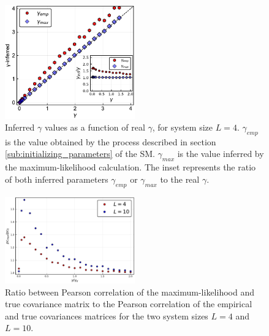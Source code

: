 \documentclass[preprint,amsmath,amssymb,superscriptaddress,showpacs,pre]{revtex4-1}
\providecommand{\DIFaddbeginFL}{} %
\providecommand{\DIFaddendFL}{} %
\providecommand{\DIFdelbeginFL}{} %
\providecommand{\DIFdelendFL}{} %
\newcommand{\DIFscaledelfig}{0.5}
\newlength{\DIFdelgraphicswidth} %
\newlength{\DIFdelgraphicsheight} %
\newcommand{\DIFaddincludegraphics}[2][]{{\color{blue}\fbox{\DIFOincludegraphics[#1]{#2}}}} %
\newcommand{\DIFdelincludegraphics}[2][]{%
\sbox{\DIFdelgraphicsbox}{\DIFOincludegraphics[#1]{#2}}%
\settoboxwidth{\DIFdelgraphicswidth}{\DIFdelgraphicsbox} %
\settoboxtotalheight{\DIFdelgraphicsheight}{\DIFdelgraphicsbox} %
\scalebox{\DIFscaledelfig}{%
\parbox[b]{\DIFdelgraphicswidth}{\usebox{\DIFdelgraphicsbox}\\[-\baselineskip] \rule{\DIFdelgraphicswidth}{0em}}\llap{\resizebox{\DIFdelgraphicswidth}{\DIFdelgraphicsheight}{%
\setlength{\unitlength}{\DIFdelgraphicswidth}%
\begin{picture}(1,1)%
\thicklines\linethickness{2pt} %
{\color[rgb]{1,0,0}\put(0,0){\framebox(1,1){}}}%
{\color[rgb]{1,0,0}\put(0,0){\line( 1,1){1}}}%
{\color[rgb]{1,0,0}\put(0,1){\line(1,-1){1}}}%
\end{picture}%
}\hspace*{3pt}}} %
} %
\DeclareRobustCommand{\DIFaddbeginFL}{\DIFOaddbeginFL \let\includegraphics\DIFaddincludegraphics} %
\DeclareRobustCommand{\DIFaddendFL}{\DIFOaddendFL \let\includegraphics\DIFOincludegraphics} %
\DeclareRobustCommand{\DIFdelbeginFL}{\DIFOdelbeginFL \let\includegraphics\DIFdelincludegraphics} %
\DeclareRobustCommand{\DIFdelendFL}{\DIFOaddendFL \let\includegraphics\DIFOincludegraphics} %
\begin{document}
\begin{figure}[!htb]
	\centering
	\DIFdelbeginFL %
\DIFdelendFL \DIFaddbeginFL \includegraphics[keepaspectratio=true,width=0.5\textwidth]{Figures/scatter_gamma_L4_100.pdf}
	\DIFaddendFL \caption{Inferred $\gamma$ values as a function of real $\gamma$, for system size $L=4$. $\gamma_{emp}$ is the value obtained by the process described in section \ref{sub:initializing_parameters} of the SM. $\gamma_{max}$ is the value inferred by the maximum-likelihood calculation. 
	The inset represents the ratio of both inferred parameters $\gamma_{emp}$ or $\gamma_{max}$ to the real $\gamma$.}
	\label{fig:scatter_gamma_L4}
\end{figure}


\begin{figure}[!htb]
	\centering
	\DIFdelbeginFL %
\DIFdelendFL \DIFaddbeginFL \includegraphics[keepaspectratio=true,width=0.5\textwidth]{Figures/Pearson_correlation_rate_full_range.pdf}
	\DIFaddendFL \caption{  Ratio between Pearson correlation of the  maximum-likelihood  and true covariance  matrix to the Pearson correlation of the  empirical and true covariances matrices for the two system sizes $L=4$ and $L=10$.}
	\label{fig:pearson_corr_comp_L4}
\end{figure}
\end{document}
